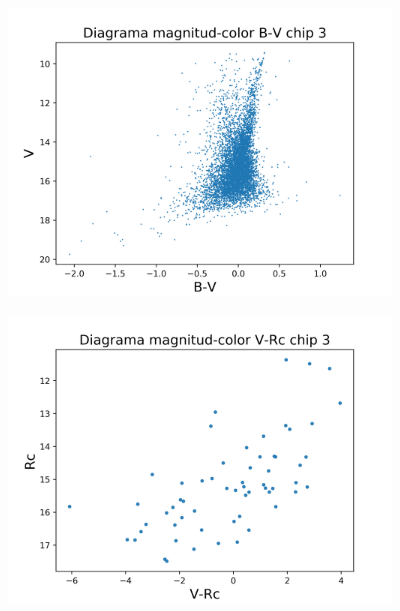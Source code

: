 \documentclass[12pt]{article}
\begin{document}
\begin{figure}[H]
  \centering
   \includegraphics[width = 4in]{B-V3.png}
\end{figure}
\begin{figure}[H]
  \centering
   \includegraphics[width = 4in]{V-Rc3.png}
\end{figure}
\end{document}

